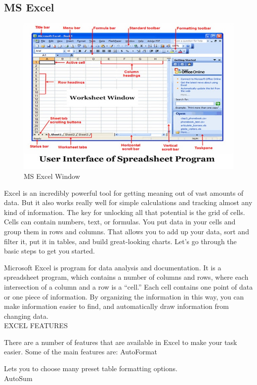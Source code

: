 \documentclass[11pt,a4paper,twoside]{article}
\begin{document}
\subsection{MS Excel}    
\begin{figure}[H]
\includegraphics[width=1\textwidth]{Fig 27.jpg}
\caption{MS Excel Window}
\end{figure}
Excel is an incredibly powerful tool for getting meaning out of vast amounts of data. But it also works really well for simple calculations and tracking almost any kind of information. The key for unlocking all that potential is the grid of cells. Cells can contain numbers, text, or formulas. You put data in your cells and group them in rows and columns. That allows you to add up your data, sort and filter it, put it in tables, and build great-looking charts. Let’s go through the basic steps to get you started.\par
Microsoft Excel is program for data analysis and documentation. It is a spreadsheet program, which contains a number of columns and rows, where each intersection of a column and a row is a “cell.” Each cell contains one point of data or one piece of information. By organizing the information in this way, you can make information easier to find, and automatically draw information from changing data.\\
EXCEL FEATURES\par
There are a number of features that are available in Excel to make your task easier. Some of the main features are: AutoFormat\par
Lets you to choose many preset table formatting options. \\
AutoSum \par
\end{document}
